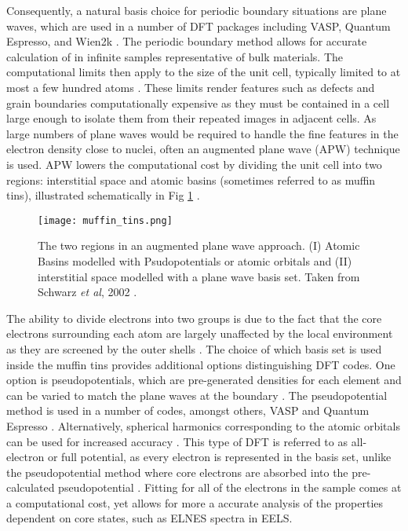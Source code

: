 Consequently, a natural basis choice for periodic boundary situations are plane waves, which are used in a number of DFT packages including VASP, Quantum Espresso, and Wien2k \cite{qe,vasp,wien2k}.  The periodic boundary method allows for accurate calculation of in infinite samples representative of bulk materials.  The computational limits then apply to the size of the unit cell, typically limited to at most a few hundred atoms \cite{mohr_linear_2018}.  These limits render features such as defects and grain boundaries computationally expensive as they must be contained in a cell large enough to isolate them from their repeated images in adjacent cells. 
As large numbers of plane waves would be required to handle the fine features in the electron density close to nuclei, often an augmented plane wave (APW) technique is used.  APW lowers the computational cost by dividing the unit cell into two regions: interstitial space and atomic basins (sometimes referred to as muffin tins), illustrated schematically  in Fig \ref{MT} \cite{wien2k}. \\
\begin{figure}
	\centering
	\texttt{[image: muffin\_tins.png]}
	\caption{The two regions in an augmented plane wave approach.  (I) Atomic Basins modelled with Psudopotentials or atomic orbitals and (II) interstitial space modelled with a plane wave basis set.  Taken from Schwarz \textit{et al}, 2002 \cite{wien2k}. }
	\label{MT}   
\end{figure}

The ability to divide electrons into two groups is due to the fact that the core electrons surrounding each atom are largely unaffected by the local environment as they are screened by the outer shells \cite{wien2k}. The choice of which basis set is used inside the muffin tins provides additional options distinguishing DFT codes.  One option is pseudopotentials, which are pre-generated densities for each element and can be varied to match the plane waves at the boundary \cite{singh_planewaves_2006}.  The pseudopotential method is used in a number of codes, amongst others, VASP and Quantum Espresso \cite{vasp,qe}.  Alternatively, spherical harmonics corresponding to the atomic orbitals can be used for increased accuracy \cite{griffiths}. This type of DFT is referred to as all-electron or full potential, as every electron is represented in the basis set, unlike the pseudopotential method where core electrons are absorbed into the pre-calculated pseudopotential \cite{wien2k}. Fitting for all of the electrons in the sample comes at a computational cost, yet allows for more a accurate analysis of the properties dependent on core states, such as ELNES spectra in EELS.   \\
 
